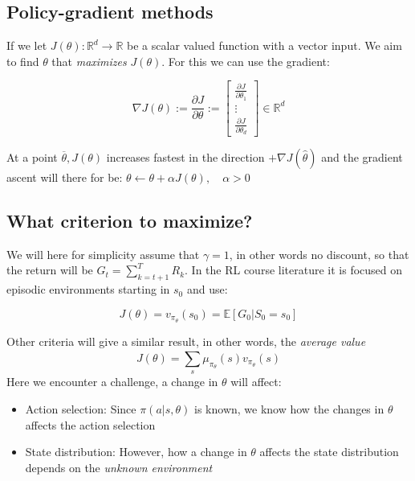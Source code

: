 \subsection*{Policy-gradient methods}
If we let $J(\theta): \mathbb{R}^{d} \rightarrow \mathbb{R}$ be a scalar valued function with a vector input. We aim to find $\theta$ that \emph{maximizes} $J(\theta)$. For this we can use the gradient:

	\begin{equation}
	 	\nabla J(\theta) := \frac{\partial J} {\partial \theta} := \begin{bmatrix} \frac{\partial J} {\partial \theta_1} \\ \vdots \\ \frac{\partial J} {\partial \theta_d}   \end{bmatrix} \in \mathbb{R}^{d}
	 \end{equation}

At a point $\overline{\theta}, J(\theta)$ increases fastest in the direction $+\nabla J(\hat{\theta})$  and the gradient ascent will there for be: $\theta \leftarrow \theta + \alpha J(\theta), \quad \alpha > 0$

\subsection*{What criterion to maximize?}
We will here for simplicity assume that $\gamma = 1$, in other words no discount, so that the return will be $G_t = \sum_{k= t+1}^{T} R_k$. In the RL course literature it is focused on episodic environments starting in $s_0$ and use:

	\begin{equation}
		J(\theta) = v_{\pi_\theta} (s_0) = \mathbb{E}[G_0 |S_0 = s_0]
	\end{equation}

Other criteria will give a similar result, in other words, the \emph{average value}
	\begin{equation}
		J(\theta) = \sum_{s}^{}\mu_{\pi_\theta}(s)v_{\pi_\theta}(s)
	\end{equation}
Here we encounter a challenge, a change in $\theta$ will affect:

\begin{itemize}
	\item Action selection: Since $\pi (a|s,\theta)$ is known, we know how the changes in $\theta$ affects the action selection
	\item State distribution: However, how a change in $\theta$ affects the state distribution depends on the \emph{unknown environment}
\end{itemize}

